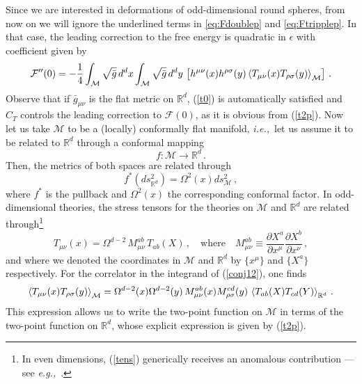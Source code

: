 \documentclass[12pt]{article}
\numberwithin{equation}{section}
\newcommand{\req}[1]{(\ref{#1})} %
\newcommand{\ssc}{\scriptscriptstyle}
\newcommand{\eg}{{\it e.g.,}\ }
\newcommand{\ie}{{\it i.e.,}\ }
\newcommand{\ctt}{C_{\ssc T}}
\begin{document}
Since we are interested in deformations of odd-dimensional round spheres, from now on we will ignore the underlined terms in \eqref{eq:Fdoublep} and \eqref{eq:Ftripplep}. In that case, the leading correction to the free energy is quadratic in $\epsilon$ with coefficient given by 
%
\begin{equation}\label{conj12}
\mathcal{F}^{\prime\prime}(0)=-\frac{1}{4} \int_{\mathcal{M}} \sqrt{\bar{g} }\, d^dx \int_{\mathcal{M}} \sqrt{\bar{g} }\, d^dy \,\left[ h^{\mu\nu}(x)h^{\rho\sigma}(y)\braket{T_{\mu\nu}(x)T_{\rho\sigma}(y)}_{\mathcal{M}} \right]  \, .
\end{equation}
%
Observe that if $\bar{g}_{\mu\nu}$ is the flat metric on $\mathbb{R}^d$, \req{t0} is automatically satisfied and $\ctt$ controls the leading correction to $\mathcal{F}(0)$, as it is obvious from \req{t2p}. Now let us take $\mathcal{M}$ to be a (locally) conformally flat manifold, \ie let us assume it to be related to $\mathbb{R}^d$ through a conformal mapping 
%
\begin{equation}\label{conj123}
f:\mathcal{M}\longrightarrow \mathbb{R}^d\, .
\end{equation}
%
Then, the metrics of both spaces are related through
%
\begin{equation}\label{conj121}
f^* (ds^2_{\mathbb{R}^d})=\Omega^2(x)ds^2_{\mathcal{M}}\, ,
\end{equation}
%
where $f^*$ is the pullback and $\Omega^2(x)$ the corresponding conformal factor. In odd-dimensional theories, the stress tensors for the theories on $\mathcal{M}$ and $\mathbb{R}^d$ are related through\footnote{In even dimensions, \req{tens} generically receives an anomalous contribution --- see \eg \cite{Perlmutter:2013gua}.}
%
\begin{equation}\label{tens}
T_{\mu\nu}(x)=\Omega^{d-2}\,M^{ab}_{\mu\nu}\,T_{ab}(X) \, ,\quad \text{where} \quad M^{ab}_{\mu\nu}\equiv \frac{\partial X^{a}}{\partial x^{\mu}}\frac{\partial X^{b}}{\partial x^{\nu}}\,,
\end{equation}
%
and where we denoted the coordinates in $\mathcal{M}$ and $\mathbb{R}^d$ by $\{x^{\mu}\}$ and $\{X^{a}\}$ respectively. For the correlator in the integrand of \req{conj12}, one finds
%
\begin{equation}\label{tens1}
\braket{T_{\mu\nu}(x)T_{\rho\sigma}(y)}_{\mathcal{M}}=\Omega^{d-2}(x)\Omega^{d-2}(y)\,M^{ab}_{\mu\nu}(x)M^{cd}_{\rho\sigma}(y)\,\braket{T_{ab}(X)T_{cd}(Y)}_{\mathbb{R}^d} \, .
\end{equation}
%
This expression allows us to write the two-point function on $\mathcal{M}$ in terms of the two-point function on $\mathbb{R}^d$, whose explicit expression is given by \req{t2p}. 
\end{document}
